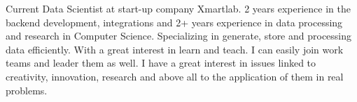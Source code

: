 

\begin{cvparagraph}

Current Data Scientist at start-up company Xmartlab. 2 years experience in the backend development, integrations and 2+ years experience in data processing and research in Computer Science. 
Specializing in generate, store and processing data efficiently. With a great interest in learn and teach. I can easily join work teams and leader them as well. I have a great interest in issues linked to creativity, innovation, research and above all to the application of them in real problems.
\end{cvparagraph}
